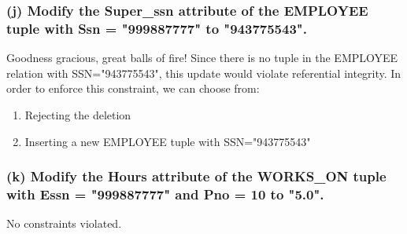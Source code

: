 \subsubsection*{(j) Modify the Super\_ssn attribute of the EMPLOYEE tuple with Ssn = "999887777" to "943775543".}
Goodness gracious, great balls of fire! Since there is no tuple in the EMPLOYEE relation with SSN="943775543", this update would violate referential integrity. In order to enforce this constraint, we can choose from:
\begin{enumerate}
\item Rejecting the deletion
\item Inserting a new EMPLOYEE tuple with SSN="943775543"
\end{enumerate}

\subsubsection*{(k) Modify the Hours attribute of the WORKS\_ON tuple with Essn = "999887777" and Pno = 10 to "5.0".}
No constraints violated.